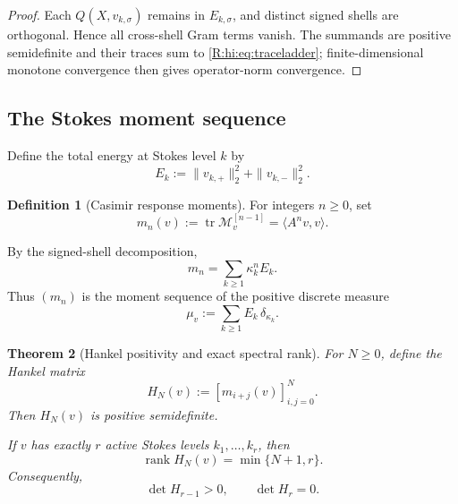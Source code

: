 \documentclass[
 aps,
 prd,
 reprint,
 amsmath,
 amssymb,
 nofootinbib,
 superscriptaddress
]{revtex4-2}
\newtheorem{theorem}{Theorem}[section]
\theoremstyle{definition}
\newtheorem{definition}[theorem]{Definition}
\theoremstyle{remark}
\newcommand{\cM}{\mathscr M}
\newcommand{\tr}{\operatorname{tr}}
\begin{document}
\begin{proof}
Each $Q(X,v_{k,\sigma})$ remains in $E_{k,\sigma}$, and distinct signed
shells are orthogonal.  Hence all cross-shell Gram terms vanish.  The
summands are positive semidefinite and their traces sum to
\eqref{R:hi:eq:traceladder}; finite-dimensional monotone convergence then gives
operator-norm convergence.
\end{proof}

\subsection{The Stokes moment sequence}

Define the total energy at Stokes level $k$ by
\begin{equation}
 E_k
 :=
 \|v_{k,+}\|_2^2+\|v_{k,-}\|_2^2.
 \label{R:hi:eq:Ek}
\end{equation}

\begin{definition}[Casimir response moments]
For integers $n\ge0$, set
\begin{equation}
 \boxed{
 m_n(v)
 :=
 \tr\cM_v^{[n-1]}
 =
 \langle A^n v,v\rangle.
 }
 \label{R:hi:eq:mn}
\end{equation}
\end{definition}

By the signed-shell decomposition,
\begin{equation}
 \boxed{
 m_n
 =
 \sum_{k\ge1}\kappa_k^nE_k.
 }
 \label{R:hi:eq:moments}
\end{equation}
Thus $(m_n)$ is the moment sequence of the positive discrete measure
\begin{equation}
 \mu_v
 :=
 \sum_{k\ge1}E_k\,\delta_{\kappa_k}.
 \label{R:hi:eq:measure}
\end{equation}

\begin{theorem}[Hankel positivity and exact spectral rank]
\label{R:hi:thm:Hankel}
For $N\ge0$, define the Hankel matrix
\begin{equation}
 H_N(v)
 :=
 [m_{i+j}(v)]_{i,j=0}^N.
 \label{R:hi:eq:Hankel}
\end{equation}
Then $H_N(v)$ is positive semidefinite.

If $v$ has exactly $r$ active Stokes levels
$k_1,\ldots,k_r$, then
\begin{equation}
 \boxed{
 \operatorname{rank}H_N(v)
 =
 \min\{N+1,r\}.
 }
 \label{R:hi:eq:Hankelrank}
\end{equation}
Consequently,
\begin{equation}
 \det H_{r-1}>0,
 \qquad
 \det H_r=0.
 \label{R:hi:eq:detcriterion}
\end{equation}
\end{theorem}
\end{document}
